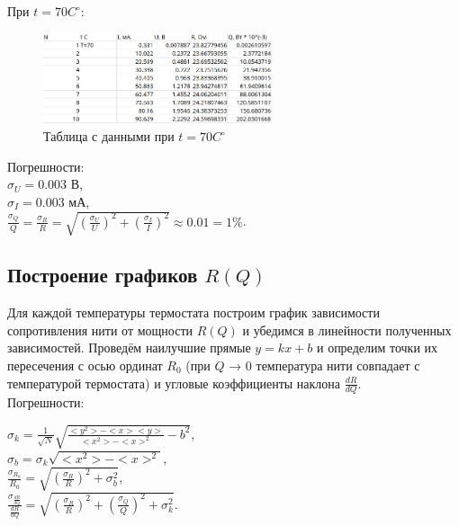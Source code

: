 \documentclass[a4paper]{article}
\begin{document}
При $t = 70C^\circ$:
\begin{figure}[ht]
    \centering
    \includegraphics[width=0.6\textwidth]{tables/T70.png}
    \caption{Таблица с данными при $t = 70C^\circ$}
\end{figure}

Погрешности:\\

$\sigma_U = 0.003 \text{ В}$, \\

$\sigma_I = 0.003 \text{ мА}$, \\

$\frac{\sigma_Q}{Q} = \frac{\sigma_R}{R} = \sqrt{(\frac{\sigma_U}{U})^2 + (\frac{\sigma_I}{I})^2} \approx 0.01 = 1\%$.  \\

\subsection{Построение графиков $R(Q)$}

Для каждой температуры термостата построим график зависимости сопротивления нити от мощности $R(Q)$ и убедимся в линейности полученных
зависимостей. Проведём наилучшие прямые $y = kx + b$ и определим точки их пересечения с осью ординат $R_0$ (при $Q$ → 0 температура нити совпадает с температурой
термостата) и угловые коэффициенты наклона $\frac{dR}{dQ}$. \\

Погрешности:

$\sigma_k = \frac{1}{\sqrt{N}} \sqrt{\frac{<y^2> - <x><y>}{<x^2> - <x>^2} - b^2}$, \\

$\sigma_b = \sigma_k \sqrt{<x^2> - <x>^2}$, \\

$\frac{\sigma_{R_0}}{R_0} = \sqrt{(\frac{\sigma_R}{R})^2 + \sigma_b^2}$,  \\

$\frac{\sigma_{\frac{dR}{dQ}}}{\frac{dR}{dQ}} = \sqrt{(\frac{\sigma_R}{R})^2 + (\frac{\sigma_Q}{Q})^2 + \sigma_k^2}$.  \\

\newpage
\end{document}
